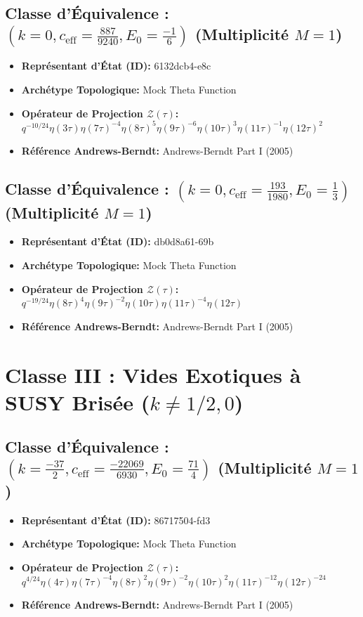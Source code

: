 \documentclass[11pt,twoside,openright]{book}
\begin{document}
\subsection*{Classe d'Équivalence : $(k=0, c_{\text{eff}}=\frac{887}{9240}, E_0=\frac{-1}{6})$ (Multiplicité $M=1$)}
\begin{itemize}
  \item \textbf{Représentant d'État (ID):} 6132dcb4-e8c
  \item \textbf{Archétype Topologique:} Mock Theta Function
  \item \textbf{Opérateur de Projection $\mathcal{Z}(\tau)$:} $q^{-10/24} \eta(3\tau) \eta(7\tau)^{-4} \eta(8\tau)^{5} \eta(9\tau)^{-6} \eta(10\tau)^{3} \eta(11\tau)^{-1} \eta(12\tau)^{2}$
  \item \textbf{Référence Andrews-Berndt:} Andrews-Berndt Part I (2005)
\end{itemize}

\subsection*{Classe d'Équivalence : $(k=0, c_{\text{eff}}=\frac{193}{1980}, E_0=\frac{1}{3})$ (Multiplicité $M=1$)}
\begin{itemize}
  \item \textbf{Représentant d'État (ID):} db0d8a61-69b
  \item \textbf{Archétype Topologique:} Mock Theta Function
  \item \textbf{Opérateur de Projection $\mathcal{Z}(\tau)$:} $q^{-19/24} \eta(8\tau)^{4} \eta(9\tau)^{-2} \eta(10\tau) \eta(11\tau)^{-4} \eta(12\tau)$
  \item \textbf{Référence Andrews-Berndt:} Andrews-Berndt Part I (2005)
\end{itemize}

\section{Classe III : Vides Exotiques à SUSY Brisée ($k \neq 1/2, 0$)}

\subsection*{Classe d'Équivalence : $(k=\frac{-37}{2}, c_{\text{eff}}=\frac{-22069}{6930}, E_0=\frac{71}{4})$ (Multiplicité $M=1$)}
\begin{itemize}
  \item \textbf{Représentant d'État (ID):} 86717504-fd3
  \item \textbf{Archétype Topologique:} Mock Theta Function
  \item \textbf{Opérateur de Projection $\mathcal{Z}(\tau)$:} $q^{4/24} \eta(4\tau) \eta(7\tau)^{-4} \eta(8\tau)^{2} \eta(9\tau)^{-2} \eta(10\tau)^{2} \eta(11\tau)^{-12} \eta(12\tau)^{-24}$
  \item \textbf{Référence Andrews-Berndt:} Andrews-Berndt Part I (2005)
\end{itemize}
\end{document}
